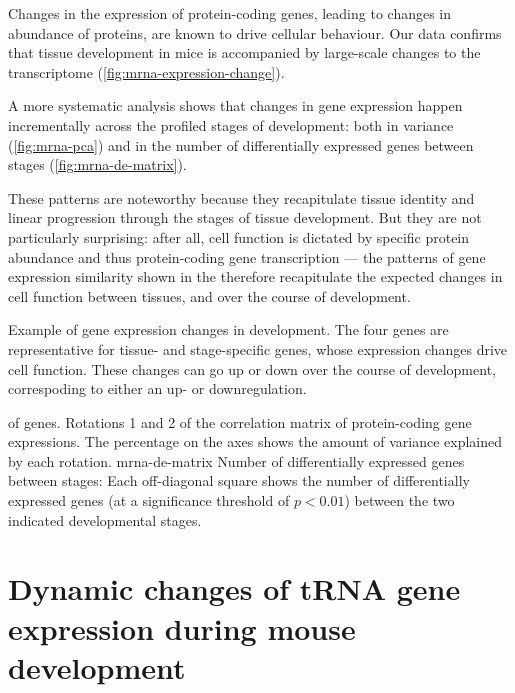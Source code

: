 Changes in the expression of protein-coding genes, leading to changes in
abundance of proteins, are known to drive cellular behaviour. Our data
confirms that tissue development in mice is accompanied by large-scale changes
to the \mrna transcriptome (\cref{fig:mrna-expression-change}).

A more systematic analysis shows that changes in gene expression happen
incrementally across the profiled stages of development: both in variance
(\cref{fig:mrna-pca}) and in the number of differentially expressed genes
between stages (\cref{fig:mrna-de-matrix}).

These patterns are noteworthy because they recapitulate tissue identity and
linear progression through the stages of tissue development. But they are not
particularly surprising: after all, cell function is dictated by specific
protein abundance and thus protein-coding gene transcription --- the patterns of
gene expression similarity shown in the \pca therefore recapitulate the expected
changes in cell function between tissues, and over the course of development.

    {Example of gene expression changes in development.}
    {The four genes are representative for tissue- and stage-specific genes,
    whose expression changes drive cell function. These changes can go up or
    down over the course of development, correspoding to either an up- or
    downregulation.}

    {\pca of \mrna genes.}
    {Rotations \num{1} and \num{2} of the correlation matrix of
    protein-coding gene expressions. The percentage on the axes shows
    the amount of variance explained by each rotation.}
    {mrna-de-matrix}
    {Number of differentially expressed \mrna genes between stages:}
    {Each off-diagonal square shows the number of differentially
    expressed genes (at a significance threshold of \(p<0.01\)) between
    the two indicated developmental stages.}

\section{Dynamic changes of tRNA gene expression during mouse development}

